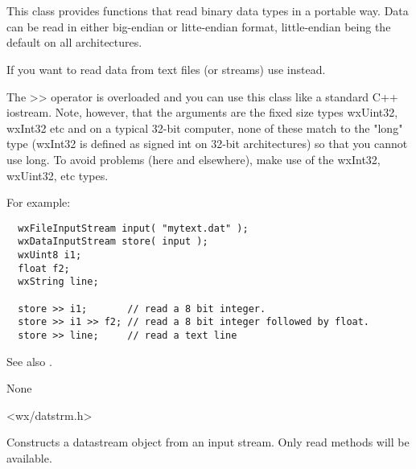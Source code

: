 \section{}\label{wxdatainputstream}

This class provides functions that read binary data types in a
portable way. Data can be read in either big-endian or litte-endian
format, little-endian being the default on all architectures.

If you want to read data from text files (or streams) use 
 instead.

The >> operator is overloaded and you can use this class like a standard C++ iostream.
Note, however, that the arguments are the fixed size types wxUint32, wxInt32 etc
and on a typical 32-bit computer, none of these match to the "long" type (wxInt32
is defined as signed int on 32-bit architectures) so that you cannot use long. To avoid
problems (here and elsewhere), make use of the wxInt32, wxUint32, etc types.

For example:

\begin{verbatim}
  wxFileInputStream input( "mytext.dat" );
  wxDataInputStream store( input );
  wxUint8 i1;
  float f2;
  wxString line;

  store >> i1;       // read a 8 bit integer.
  store >> i1 >> f2; // read a 8 bit integer followed by float.
  store >> line;     // read a text line
\end{verbatim}

See also . 


None


<wx/datstrm.h>


\label{wxdatainputstreamconstr}


Constructs a datastream object from an input stream. Only read methods will
be available.


